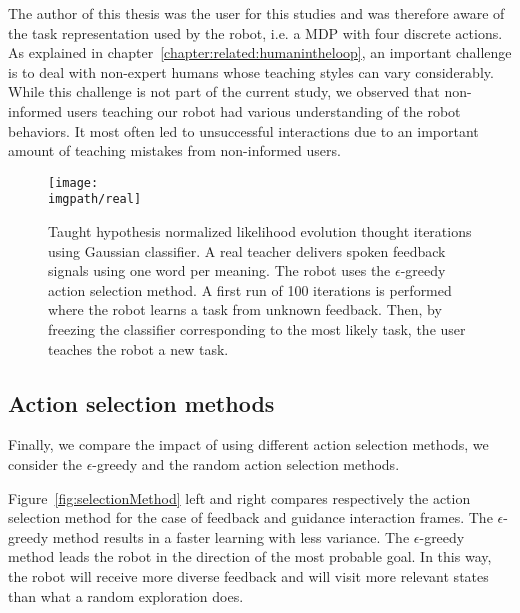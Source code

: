 The author of this thesis was the user for this studies and was therefore aware of the task representation used by the robot, i.e. a MDP with four discrete actions. As explained in chapter~\ref{chapter:related:humanintheloop}, an important challenge is to deal with non-expert humans whose teaching styles can vary considerably. While this challenge is not part of the current study, we observed that non-informed users teaching our robot had various understanding of the robot behaviors. It most often led to unsuccessful interactions due to an important amount of teaching mistakes from non-informed users.


\begin{figure}[!htbp]
  \centering
  \texttt{[image: \\imgpath/real]}
  \caption{Taught hypothesis normalized likelihood evolution thought iterations using Gaussian classifier. A real teacher delivers spoken feedback signals using one word per meaning. The robot uses the $\epsilon$-greedy action selection method. A first run of 100 iterations is performed where the robot learns a task from unknown feedback. Then, by freezing the classifier corresponding to the most likely task, the user teaches the robot a new task.}
  \label{fig:Real}
\end{figure}


\subsection{Action selection methods}

Finally, we compare the impact of using different action selection methods, we consider the $\epsilon$-greedy and the random action selection methods.

Figure~\ref{fig:selectionMethod} left and right compares respectively the action selection method for the case of feedback and guidance interaction frames. The $\epsilon$-greedy method results in a faster learning with less variance. The $\epsilon$-greedy method leads the robot in the direction of the most probable goal. In this way, the robot will receive more diverse feedback and will visit more relevant states than what a random exploration does.

